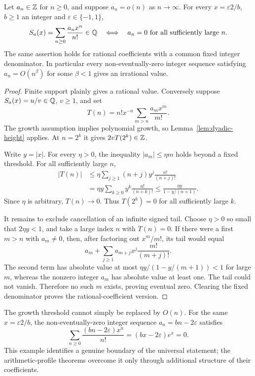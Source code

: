 \begin{theorem}
\label{thm:v5-sublinear}
Let $a_n\in\mathbb Z$ for $n\geq0$, and suppose $a_n=o(n)$ as $n\to\infty$.
For every $x=\varepsilon2/b$, $b\geq1$ an integer and
$\varepsilon\in\{-1,1\}$,
\[
 S_a(x)=\sum_{n\geq0}\frac{a_nx^n}{n!}\in\mathbb Q
 \quad\Longleftrightarrow\quad
 a_n=0\text{ for all sufficiently large }n.
\]
The same assertion holds for rational coefficients with a common fixed
integer denominator.  In particular every non-eventually-zero integer
sequence satisfying $a_n=O(n^\beta)$ for some $\beta<1$ gives an
irrational value.
\end{theorem}
\begin{proof}
Finite support plainly gives a rational value.  Conversely suppose
$S_a(x)=u/v\in\mathbb Q$, $v\geq1$, and set
\[
 T(n)=n!x^{-n}\sum_{m>n}\frac{a_mx^m}{m!}.
\]
The growth assumption implies polynomial growth, so
Lemma~\ref{lem:dyadic-height} applies.  At $n=2^k$ it gives
$2vT(2^k)\in\mathbb Z$.

Write $y=|x|$.  For every $\eta>0$, the inequality
$|a_m|\leq\eta m$ holds beyond a fixed threshold.  For all sufficiently
large $n$,
\begin{align*}
 |T(n)|
 &\leq\eta\sum_{j\geq1}(n+j)y^j\frac{n!}{(n+j)!}\\
 &=\eta y\sum_{k\geq0}y^k\frac{n!}{(n+k)!}
 \leq\frac{\eta y}{1-y/(n+1)}.
\end{align*}
Since $\eta$ is arbitrary, $T(n)\to0$.  Thus $T(2^k)=0$ for all
sufficiently large $k$.

It remains to exclude cancellation of an infinite signed tail.
Choose $\eta>0$ so small that $2\eta y<1$, and take a large index
$n$ with $T(n)=0$.  If there were a first $m>n$ with $a_m\ne0$,
then, after factoring out $x^m/m!$, its tail would equal
\[
 a_m+\sum_{j\geq1}a_{m+j}x^j\frac{m!}{(m+j)!}.
\]
The second term has absolute value at most
$\eta y/(1-y/(m+1))<1$ for large $m$, whereas the nonzero integer
$a_m$ has absolute value at least one.  The tail could not vanish.
Therefore no such $m$ exists, proving eventual zero.  Clearing the
fixed denominator proves the rational-coefficient version.
\end{proof}

The growth threshold cannot simply be replaced by $O(n)$.  For the
same $x=\varepsilon2/b$, the non-eventually-zero integer sequence
$a_n=bn-2\varepsilon$ satisfies
\[
 \sum_{n\geq0}\frac{(bn-2\varepsilon)x^n}{n!}
 =(bx-2\varepsilon)e^x=0.
\]
This example identifies a genuine boundary of the universal statement;
the arithmetic-profile theorems overcome it only through additional
structure of their coefficients.

